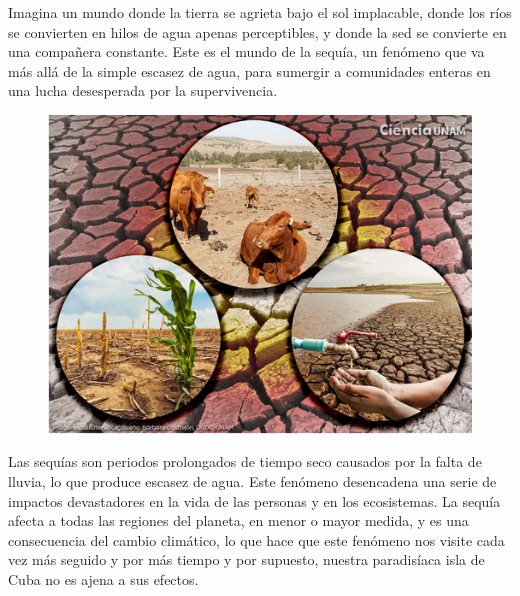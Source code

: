 \documentclass[12pt]{article}
\begin{document}
	
	Imagina un mundo donde la tierra se agrieta bajo el sol implacable, donde los ríos se convierten en hilos de agua apenas perceptibles, y donde la sed se convierte en una compañera constante. Este es el mundo de la sequía, un fenómeno que va más allá de la simple escasez de agua, para sumergir a comunidades enteras en una lucha desesperada por la supervivencia.
    \par\vspace{4mm}
	\begin{figure}[H]
		\centering
		\includegraphics[width=0.7\linewidth]{./images/4.png}
		\label{fig:ian}
	\end{figure}
	\par\vspace{4mm}
	Las sequías son periodos prolongados de tiempo seco causados por la falta de lluvia, lo que produce escasez de agua. Este fenómeno desencadena una serie de impactos devastadores en la vida de las personas y en los ecosistemas. La sequía afecta a todas las regiones del planeta, en menor o mayor medida, y es una consecuencia del cambio climático, lo que hace que este fenómeno nos visite cada vez más seguido y por más tiempo y por supuesto, nuestra paradisíaca isla de Cuba no es ajena a sus efectos.
	
\end{document}
